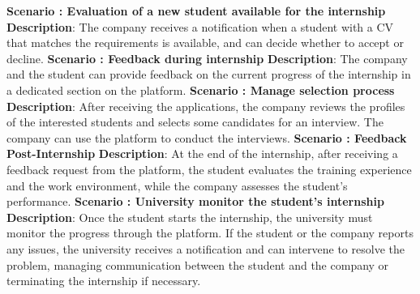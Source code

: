 \documentclass{article}
\begin{document}
\newline
{}
\textbf{Scenario \thescenario: Evaluation of a new student available for the internship}\newline
\textbf{Description}:  The company receives a notification when a student with a CV that matches the requirements is available, and can decide whether to accept or decline.
\newline
\newline
{}
\textbf{Scenario \thescenario: Feedback during internship}\newline
\textbf{Description}:  The company and the student can provide feedback on the current progress of the internship in a dedicated section on the platform.\newline
\newline
{}
\textbf{Scenario \thescenario: Manage selection process}\newline
\textbf{Description}: After receiving the applications, the company reviews the profiles of the interested students and selects some candidates for an interview. The company can use the platform to conduct the interviews.
\newline
\newline
{}
\textbf{Scenario \thescenario: Feedback Post-Internship}\newline
\textbf{Description}: At the end of the internship, after receiving a feedback request from the platform, the student evaluates the training experience and the work environment, while the company assesses the student's performance.
\newline
\newline
{}
\textbf{Scenario \thescenario: University monitor the student's internship}\newline
\textbf{Description}: Once the student starts the internship, the university must monitor the progress through the platform. If the student or the company reports any issues, the university receives a notification and can intervene to resolve the problem, managing communication between the student and the company or terminating the internship if necessary.\newline
\end{document}
